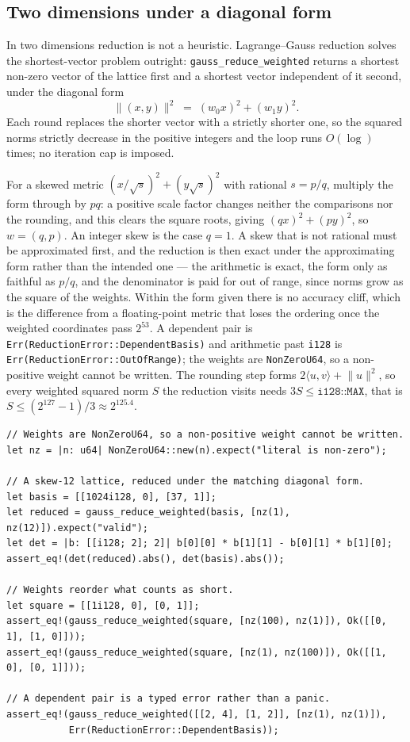 \documentclass[11pt]{article}
\newcommand{\code}[1]{\texttt{#1}}
\begin{document}
\subsection{Two dimensions under a diagonal form}

In two dimensions reduction is not a heuristic. Lagrange--Gauss reduction
solves the shortest-vector problem outright: \code{gauss\_reduce\_weighted}
returns a shortest non-zero vector of the lattice first and a shortest vector
independent of it second, under the diagonal form
\begin{equation}
\|(x, y)\|^2 \;=\; (w_0 x)^2 + (w_1 y)^2 .
\end{equation}
Each round replaces the shorter vector with a strictly shorter one, so the
squared norms strictly decrease in the positive integers and the loop runs
$O(\log)$ times; no iteration cap is imposed.

For a skewed metric $(x/\sqrt{s})^2 + (y\sqrt{s})^2$ with rational
$s = p/q$, multiply the form through by $pq$: a positive scale factor changes
neither the comparisons nor the rounding, and this clears the square roots,
giving $(qx)^2 + (py)^2$, so $w = (q, p)$. An integer skew is the case
$q = 1$. A skew that is not rational must be approximated first, and the
reduction is then exact under the approximating form rather than the intended
one --- the arithmetic is exact, the form only as faithful as $p/q$, and the
denominator is paid for out of range, since norms grow as the square of the
weights. Within the form given there is no accuracy cliff, which is the
difference from a floating-point metric that loses the ordering once the
weighted coordinates pass $2^{53}$. A dependent pair is
\code{Err(ReductionError::DependentBasis)} and arithmetic past \code{i128}
is \code{Err(ReductionError::OutOfRange)}; the weights are
\code{NonZeroU64}, so a non-positive weight cannot be written. The rounding
step forms $2\langle u, v\rangle + \lVert u \rVert^2$, so every weighted
squared norm $S$ the reduction visits needs $3S \le \code{i128::MAX}$,
that is $S \le (2^{127} - 1)/3 \approx 2^{125.4}$.

\begin{lstlisting}
// Weights are NonZeroU64, so a non-positive weight cannot be written.
let nz = |n: u64| NonZeroU64::new(n).expect("literal is non-zero");

// A skew-12 lattice, reduced under the matching diagonal form.
let basis = [[1024i128, 0], [37, 1]];
let reduced = gauss_reduce_weighted(basis, [nz(1), nz(12)]).expect("valid");
let det = |b: [[i128; 2]; 2]| b[0][0] * b[1][1] - b[0][1] * b[1][0];
assert_eq!(det(reduced).abs(), det(basis).abs());

// Weights reorder what counts as short.
let square = [[1i128, 0], [0, 1]];
assert_eq!(gauss_reduce_weighted(square, [nz(100), nz(1)]), Ok([[0, 1], [1, 0]]));
assert_eq!(gauss_reduce_weighted(square, [nz(1), nz(100)]), Ok([[1, 0], [0, 1]]));

// A dependent pair is a typed error rather than a panic.
assert_eq!(gauss_reduce_weighted([[2, 4], [1, 2]], [nz(1), nz(1)]),
           Err(ReductionError::DependentBasis));
\end{lstlisting}
\end{document}
